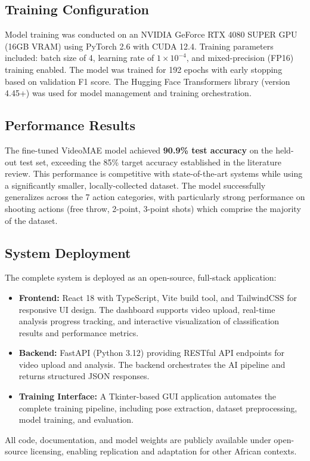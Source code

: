 \documentclass[conference]{IEEEtran}
\begin{document}
\subsection{Training Configuration}
Model training was conducted on an NVIDIA GeForce RTX 4080 SUPER GPU (16GB VRAM) using PyTorch 2.6 with CUDA 12.4. Training parameters included: batch size of 4, learning rate of $1 \times 10^{-4}$, and mixed-precision (FP16) training enabled. The model was trained for 192 epochs with early stopping based on validation F1 score. The Hugging Face Transformers library (version 4.45+) was used for model management and training orchestration.

\subsection{Performance Results}
The fine-tuned VideoMAE model achieved \textbf{90.9\% test accuracy} on the held-out test set, exceeding the 85\% target accuracy established in the literature review. This performance is competitive with state-of-the-art systems while using a significantly smaller, locally-collected dataset. The model successfully generalizes across the 7 action categories, with particularly strong performance on shooting actions (free throw, 2-point, 3-point shots) which comprise the majority of the dataset.

\subsection{System Deployment}
The complete system is deployed as an open-source, full-stack application:
\begin{itemize}
\item \textbf{Frontend:} React 18 with TypeScript, Vite build tool, and TailwindCSS for responsive UI design. The dashboard supports video upload, real-time analysis progress tracking, and interactive visualization of classification results and performance metrics.
\item \textbf{Backend:} FastAPI (Python 3.12) providing RESTful API endpoints for video upload and analysis. The backend orchestrates the AI pipeline and returns structured JSON responses.
\item \textbf{Training Interface:} A Tkinter-based GUI application automates the complete training pipeline, including pose extraction, dataset preprocessing, model training, and evaluation.
\end{itemize}

All code, documentation, and model weights are publicly available under open-source licensing, enabling replication and adaptation for other African contexts.
\end{document}
